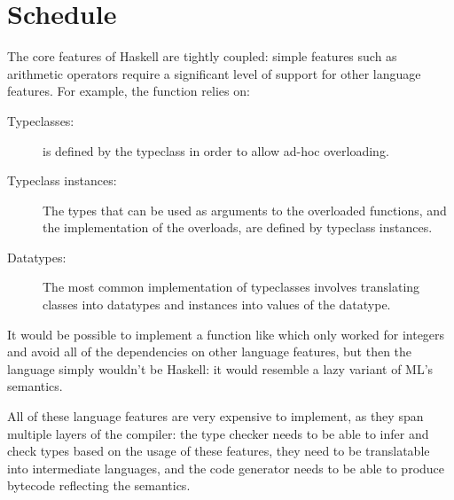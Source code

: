 \documentclass[dissertation.tex]{subfiles}
\begin{document}
\section{Schedule}
{


    The core features of Haskell are tightly coupled: simple features such as arithmetic operators require a significant
    level of support for other language features. For example, the \haskell{(+)} function relies on:

    \begin{description}
    \item[Typeclasses:] \haskell{(+)} is defined by the  typeclass in order to allow ad-hoc overloading.
    \item[Typeclass instances:]
    {
        The types that can be used as arguments to the overloaded functions, and the implementation of the overloads,
        are defined by typeclass instances.
    }
    \item[Datatypes:]
    {
        The most common implementation of typeclasses involves translating classes into datatypes and instances into
        values of the datatype.
    }
    \end{description}

    It would be possible to implement a function like \haskell{(+)} which only worked for integers and avoid all of the
    dependencies on other language features, but then the language simply wouldn't be Haskell: it would resemble a lazy
    variant of ML's semantics.

    All of these language features are very expensive to implement, as they span multiple layers of the compiler: the
    type checker needs to be able to infer and check types based on the usage of these features, they need to be
    translatable into intermediate languages, and the code generator needs to be able to produce bytecode reflecting the
    semantics.

}
\end{document}
